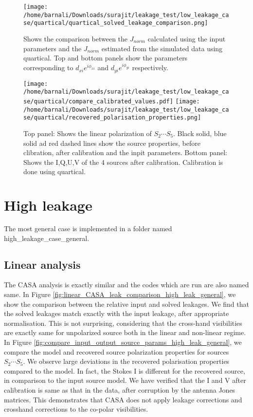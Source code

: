 \documentclass{article}
\begin{document}
\begin{figure}
\centering
\texttt{[image: /home/barnali/Downloads/surajit/leakage\_test/low\_leakage\_case/quartical/quartical\_solved\_leakage\_comparison.png]}
\caption{Shows the comparison between the $J_{norm}$ calculated using the input parameters and the $J_{norm}$ estimated from the simulated data using quartical. Top and bottom panels show the parameters corresponding to $d_{xi}e^{i\phi_{xi}}$ and $d_{yi}e^{i\phi_{yi}}$ respectively. }
\label{fig:nonlinear_quartical_leak_comparison}
\end{figure}

\begin{figure}
\centering
\texttt{[image: /home/barnali/Downloads/surajit/leakage\_test/low\_leakage\_case/quartical/compare\_calibrated\_values.pdf]}
\texttt{[image: /home/barnali/Downloads/surajit/leakage\_test/low\_leakage\_case/quartical/recovered\_polarisation\_properties.png]}
\caption{Top panel: Shows the linear polarization of $S_2\cdots S_5$. Black solid, blue solid ad red dashed lines show the source properties, before clibration, after calibration and the inpit parameters. Bottom panel: Shows the I,Q,U,V of the 4 sources after calibration. Calibration is done using quartical.}
\label{fig:compare_input_output_source_params_nonlinear}
\end{figure}

\section{High leakage}

The most general case is implemented in a folder named high\_leakage\_case\_general. 

\subsection{Linear analysis}

The CASA analysis is exactly similar and the codes which are run are also named same. In Figure \ref{fig:linear_CASA_leak_comparison_high_leak_general}, we show the comparison between the relative input and solved leakages. We find that the solved leakages match exactly with the input leakage, after appropriate normalisation. This is not surprising, considering that the cross-hand visibilities are exactly same for unpolarized source both in the linear and non-linear regime. In Figure \ref{fig:compare_input_output_source_params_high_leak_general}, we compare the model and recovered source polarization properties for sources $S_2\cdots S_5$. We observe large deviations in the recovered polarisation properties compared to the model. In fact, the Stokes I is different for the recovered source, in comparison to the input source model. We have verified that the I and V after calibration is same as that in the data, after corruption by the antenna Jones matrices. This demonstrates that CASA does not apply leakage corrections and crosshand corrections to the co-polar visibilities.
\end{document}
